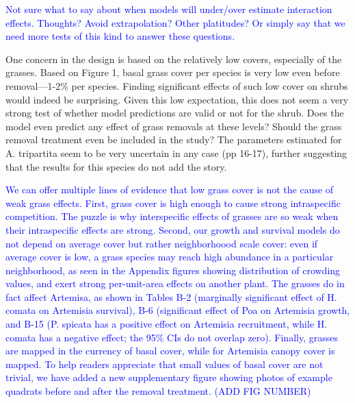 \documentclass[12pt]{article}
\newcommand{\response}{\textcolor{blue}}
\begin{document}
\response{Not sure what to say about when models will under/over estimate interaction effects. Thoughts? Avoid extrapolation? Other platitudes?
Or simply say that we need more tests of this kind to answer these questions. }

One concern in the design is based on the relatively low covers, especially of the grasses. Based on
Figure 1, basal grass cover per species is very low even before removal—1-2\% per species. Finding
significant effects of such low cover on shrubs would indeed be surprising. Given this low expectation,
this does not seem a very strong test of whether model predictions are valid or not for the shrub. Does
the model even predict any effect of grass removals at these levels? Should the grass removal
treatment even be included in the study? The parameters estimated for A. tripartita seem to be very
uncertain in any case (pp 16-17), further suggesting that the results for this species do not add the story.

\response{We can offer multiple lines of evidence that low grass cover is not the cause of weak grass effects. 
First, grass cover is high enough to cause strong intraspecific competition. The puzzle is why interspecific effects
of grasses are so weak when their intraspecific effects are strong. Second, our growth and survival models do not
depend on average cover but rather neighborhoood scale cover: even if average cover is low, a
grass species may reach high abundance in a particular neighborhood, as seen in the Appendix figures
showing distribution of crowding values, and exert strong per-unit-area effects on another plant. The grasses do in fact
affect Artemisa, as shown in Tables B-2 (marginally significant effect of H. comata on Artemisia survival), B-6 (significant 
effect of Poa on Artemisia growth, and  B-15 (P. spicata has a positive effect on Artemisia recruitment, while H. comata
has a negative effect; the 95\% CIs do not overlap zero). Finally,
grasses are mapped in the currency of basal cover, while for Artemisia canopy cover is mapped. To help readers
appreciate that small values of basal cover are not trivial, we have added a new supplementary figure showing 
photos of example quadrats before and after the removal treatment. (ADD FIG NUMBER)  }
\end{document}
